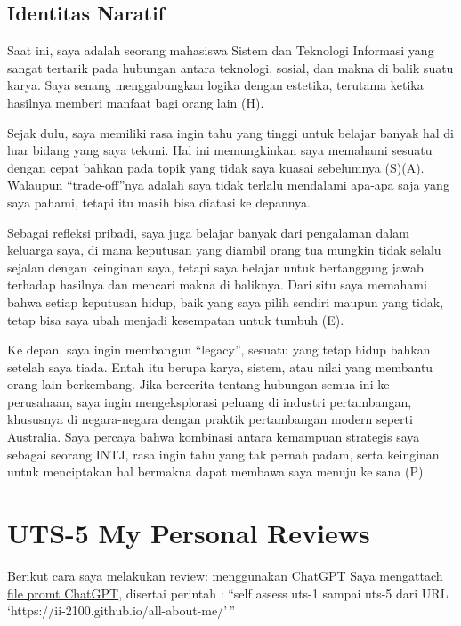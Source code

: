 \documentclass[
  letterpaper,
  DIV=11,
  numbers=noendperiod]{scrreprt}
\begin{document}
\section{Identitas Naratif}\label{identitas-naratif}

Saat ini, saya adalah seorang mahasiswa Sistem dan Teknologi Informasi
yang sangat tertarik pada hubungan antara teknologi, sosial, dan makna
di balik suatu karya. Saya senang menggabungkan logika dengan estetika,
terutama ketika hasilnya memberi manfaat bagi orang lain (H).

Sejak dulu, saya memiliki rasa ingin tahu yang tinggi untuk belajar
banyak hal di luar bidang yang saya tekuni. Hal ini memungkinkan saya
memahami sesuatu dengan cepat bahkan pada topik yang tidak saya kuasai
sebelumnya (S)(A). Walaupun ``trade-off''nya adalah saya tidak terlalu
mendalami apa-apa saja yang saya pahami, tetapi itu masih bisa diatasi
ke depannya.

Sebagai refleksi pribadi, saya juga belajar banyak dari pengalaman dalam
keluarga saya, di mana keputusan yang diambil orang tua mungkin tidak
selalu sejalan dengan keinginan saya, tetapi saya belajar untuk
bertanggung jawab terhadap hasilnya dan mencari makna di baliknya. Dari
situ saya memahami bahwa setiap keputusan hidup, baik yang saya pilih
sendiri maupun yang tidak, tetap bisa saya ubah menjadi kesempatan untuk
tumbuh (E).

Ke depan, saya ingin membangun ``legacy'', sesuatu yang tetap hidup
bahkan setelah saya tiada. Entah itu berupa karya, sistem, atau nilai
yang membantu orang lain berkembang. Jika bercerita tentang hubungan
semua ini ke perusahaan, saya ingin mengeksplorasi peluang di industri
pertambangan, khususnya di negara-negara dengan praktik pertambangan
modern seperti Australia. Saya percaya bahwa kombinasi antara kemampuan
strategis saya sebagai seorang INTJ, rasa ingin tahu yang tak pernah
padam, serta keinginan untuk menciptakan hal bermakna dapat membawa saya
menuju ke sana (P).


\chapter{UTS-5 My Personal Reviews}\label{uts-5-my-personal-reviews}

Berikut cara saya melakukan review: menggunakan ChatGPT Saya mengattach
\href{skor_uts.pdf}{file promt ChatGPT}, disertai perintah : ``self
assess uts-1 sampai uts-5 dari URL
`https://ii-2100.github.io/all-about-me/'\,''
\end{document}

